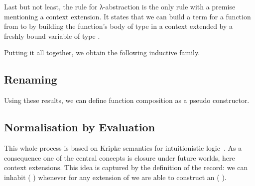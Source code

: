 \documentclass{article}
\begin{document}
Last but not least, the rule for λ-abstraction is the only rule
with a premise mentioning a context extension. It states that
we can build a term for a function from  to  by
building the function's body of type  in a context extended
by a freshly bound variable of type .

\noindent
\begin{minipage}[t]{.5\textwidth}
\end{minipage}\hfill
\begin{minipage}[t]{.35\textwidth}
\begin{mathpar}
\end{mathpar}
\end{minipage}


Putting it all together, we obtain the following inductive family.

\begin{AgdaAlign}
\begin{AgdaSuppressSpace}
\end{AgdaSuppressSpace}
\end{AgdaAlign}

\subsection{Renaming}


Using these results, we can define function composition
as a pseudo constructor.

\label{def:composition}

\subsection{Normalisation by Evaluation}

This whole process is based on Kripke semantics for intuitionistic
logic~\cite{DBLP:journals/apal/MitchellM91}.
As a consequence one of the central concepts is closure under future
worlds, here context extensions.
This idea is captured by the definition of the  record: we
can inhabit (  ) whenever for any extension
 of  we are able to construct an ( ).

\end{document}
